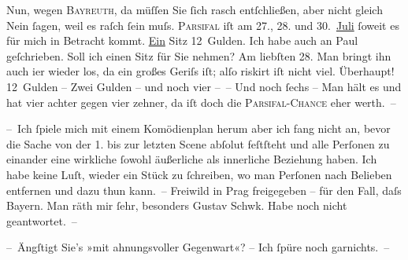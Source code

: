 \pstart
           Nun, wegen \textsc{Bayreuth}, da müſſen Sie{ }ſich rasch {\pb}entſchließen, aber
               nicht gleich Nein{ }ſagen, weil es raſch{ }ſein muſs. \textsc{Parsifal} iſt am 27., 28. und 30. \uline{Juli}{ }ſoweit es für mich in Betracht kommt. \uline{Ein}{ }Sitz 12 Gulden. Ich habe auch an Paul geſchrieben. Soll ich ei{\pb}nen Sitz für Sie nehmen? Am liebſten 28.
               Man bringt ihn auch i{\geminationm}er wieder los, da ein großes
               Geriſs iſt; alſo riskirt iſt nicht viel. Überhaupt! 12 Gulden – Zwei Gulden – und
               noch vier – – Und noch{ }ſechs – Man {\pb}hält es und hat
               vier achter gegen vier zehner, da iſt doch die \textsc{Parsifal-Chance} eher werth. –\pend
           
\pstart
           – Ich{ }ſpiele mich mit einem Komödienplan herum {\dotsfour} aber ich fang nicht an,
               bevor die Sache von der 1. bis zur letzten Scene abſolut feſtſteht und alle {\pb}Perſonen zu einander eine wirkliche{ }ſowohl äußerliche
               als innerliche Beziehung haben. Ich habe keine Luſt, wieder ein Stück zu{ }ſchreiben,
               wo man Perſonen nach Belieben entfernen und dazu thun kann. – Freiwild in Prag frei{\pb}gegeben – für den Fall, daſs Bayern. Man räth mir{ }ſehr, besonders Gustav Schwk. Habe noch nicht geantwortet. –\pend
           
\pstart
           – Ängſtigt Sie’s »mit ahnungsvoller
                  Gegenwart«? – Ich{ }ſpüre noch garnichts. –\pend
           

